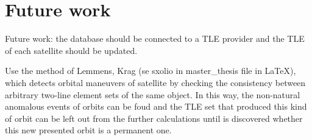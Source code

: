 

\bigskip
\section{Future work}
\bigskip


Future work: the database should be connected to a TLE provider and the TLE of each satellite should be updated.

Use the method of Lemmens, Krag (se sxolio in master_thesis file in LaTeX), which detects orbital maneuvers of satellite by checking the consistency between arbitrary two-line element sets of the same object. In this way, the non-natural anomalous events of orbits can be foud and the TLE set that produced this kind of orbit can be left out from the further calculations until is discovered whether this new presented orbit is a permanent one.





